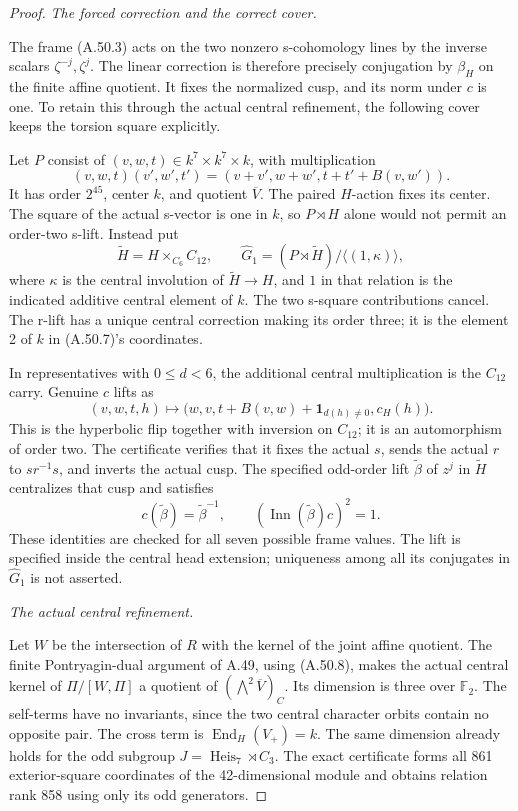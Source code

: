 \begin{proof}
\emph{The forced correction and the correct cover.}\par
The frame (A.50.3) acts on the two nonzero
s-cohomology lines by the inverse scalars
\(\zeta^{-j},\zeta^j\). The linear correction
is therefore precisely conjugation by
\(\beta_H\) on the finite affine quotient.
It fixes the normalized cusp, and its norm
under \(c\) is one. To retain this through
the actual central refinement, the following
cover keeps the torsion square explicitly.

Let \(P\) consist of \((v,w,t)\in k^7\times
k^7\times k\), with multiplication
\[
 (v,w,t)(v',w',t')
       =(v+v',w+w',t+t'+B(v,w')).
\]
It has order \(2^{45}\), center \(k\),
and quotient \(\overline V\). The paired
\(H\)-action fixes its center. The square
of the actual s-vector is one in \(k\),
so \(P\rtimes H\) alone would not permit
an order-two s-lift. Instead put
\[
 \widetilde H=H\times_{C_6}C_{12},
 \qquad
 \widehat G_1=(P\rtimes\widetilde H)
                    /\langle(1,\kappa)\rangle,
 \tag{A.50.9}
\]
where \(\kappa\) is the central involution
of \(\widetilde H\to H\), and \(1\) in
that relation is the indicated additive
central element of \(k\). The two s-square
contributions cancel. The r-lift has a
unique central correction making its order
three; it is the element 2 of \(k\) in
(A.50.7)'s coordinates.

In representatives with \(0\leq d<6\),
the additional central multiplication is
the \(C_{12}\) carry. Genuine \(c\) lifts as
\[
 (v,w,t,h)\longmapsto
 \bigl(w,v,t+B(v,w)+\mathbf1_{d(h)\ne0},c_H(h)\bigr).
 \tag{A.50.10}
\]
This is the hyperbolic flip together with
inversion on \(C_{12}\); it is an automorphism
of order two. The certificate verifies that
it fixes the actual \(s\), sends the actual
\(r\) to \(sr^{-1}s\), and inverts the
actual cusp. The specified odd-order lift
\(\widetilde\beta\) of \(z^j\) in
\(\widetilde H\) centralizes that cusp and
satisfies
\[
 c(\widetilde\beta)=\widetilde\beta^{-1},
 \qquad
 (\operatorname{Inn}(\widetilde\beta)c)^2=1.
 \tag{A.50.11}
\]
These identities are checked for all seven
possible frame values. The lift is specified
inside the central head extension; uniqueness
among all its conjugates in \(\widehat G_1\)
is not asserted.

\emph{The actual central refinement.}\par
Let \(W\) be the intersection of \(R\) with
the kernel of the joint affine quotient.
The finite Pontryagin-dual argument of A.49,
using (A.50.8), makes the actual central
kernel of \(\Pi/[W,\Pi]\) a quotient of
\((\bigwedge^2\overline V)_C\). Its dimension
is three over \(\mathbb F_2\). The self-terms
have no invariants, since the two central
character orbits contain no opposite pair.
The cross term is
\(\operatorname{End}_H(V_+)=k\).
The same dimension already holds for the
odd subgroup
\(J=\operatorname{Heis}_7\rtimes C_3\).
The exact certificate forms all 861
exterior-square coordinates of the
42-dimensional module and obtains relation
rank 858 using only its odd generators.


\end{proof}
